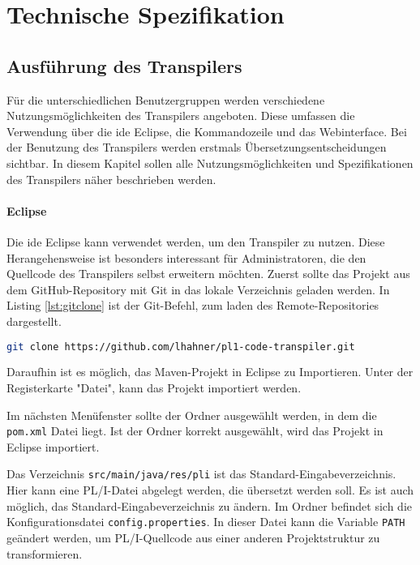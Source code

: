 \pagebreak
\section{Technische Spezifikation}
\subsection{Ausführung des Transpilers}

Für die unterschiedlichen Benutzergruppen werden verschiedene Nutzungsmöglichkeiten des Transpilers angeboten. Diese umfassen die Verwendung über die \ac{ide} Eclipse, die Kommandozeile und das Webinterface. Bei der Benutzung des Transpilers werden erstmals Übersetzungsentscheidungen sichtbar. In diesem Kapitel sollen alle Nutzungsmöglichkeiten und Spezifikationen des Transpilers näher beschrieben werden.

\paragraph{Eclipse}
Die \ac{ide} Eclipse kann verwendet werden, um den Transpiler zu nutzen. Diese Herangehensweise ist besonders interessant für Administratoren, die den Quellcode des Transpilers selbst erweitern möchten.
Zuerst sollte das Projekt aus dem GitHub-Repository mit Git in das lokale Verzeichnis geladen werden.
In Listing \ref{lst:gitclone} ist der Git-Befehl, zum laden des Remote-Repositories dargestellt. 

\begin{lstlisting}[language=bash, caption=Herunterladen der Repository des Transpilers, label={lst:gitclone}]
git clone https://github.com/lhahner/pl1-code-transpiler.git
\end{lstlisting}

Daraufhin ist es möglich, das Maven-Projekt in Eclipse zu Importieren. Unter der Registerkarte "Datei", kann das Projekt importiert werden. %


Im nächsten Menüfenster sollte der Ordner ausgewählt werden, in dem die \verb+pom.xml+ Datei liegt. Ist der Ordner korrekt ausgewählt, wird das Projekt in Eclipse importiert. 

Das Verzeichnis \verb+src/main/java/res/pli+ ist das Standard-Eingabeverzeichnis. Hier kann eine PL/I-Datei abgelegt werden, die übersetzt werden soll. Es ist auch möglich, das Standard-Eingabeverzeichnis zu ändern. 
Im Ordner  befindet sich die Konfigurationsdatei 
\verb+config.properties+. In dieser Datei kann die Variable \verb+PATH+ geändert werden, 
um PL/I-Quellcode aus einer anderen Projektstruktur zu transformieren.

